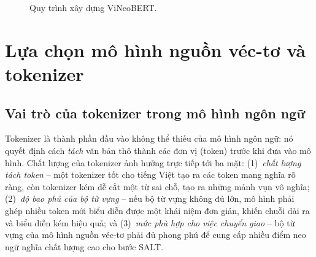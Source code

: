 \begin{figure}[ht]
  \centering
  \caption{Quy trình xây dựng ViNeoBERT.}
  \label{fig:pipeline}
\end{figure}

\section{Lựa chọn mô hình nguồn véc-tơ và tokenizer}
\label{sec:donor-tokenizer}

\subsection{Vai trò của tokenizer trong mô hình ngôn ngữ}
\label{subsec:tokenizer-intro}

Tokenizer là thành phần đầu vào không thể thiếu của mô hình ngôn ngữ:
nó quyết định cách \textit{tách} văn bản thô thành các đơn vị (token) trước khi đưa vào
mô hình. Chất lượng của tokenizer ảnh hưởng trực tiếp tới ba mặt: (1)~\textit{chất lượng
tách token} -- một tokenizer tốt cho tiếng Việt tạo ra các token mang nghĩa rõ ràng, còn
tokenizer kém dễ cắt một từ sai chỗ, tạo ra những mảnh vụn vô nghĩa; (2)~\textit{độ bao phủ
của bộ từ vựng} -- nếu bộ từ vựng không đủ lớn, mô hình phải ghép nhiều token mới biểu diễn
được một khái niệm đơn giản, khiến chuỗi dài ra và biểu diễn kém hiệu quả; và (3)~\textit{mức
phù hợp cho việc chuyển giao} -- bộ từ vựng của mô hình nguồn véc-tơ phải đủ phong phú để
cung cấp nhiều điểm neo ngữ nghĩa chất lượng cao cho bước SALT.

